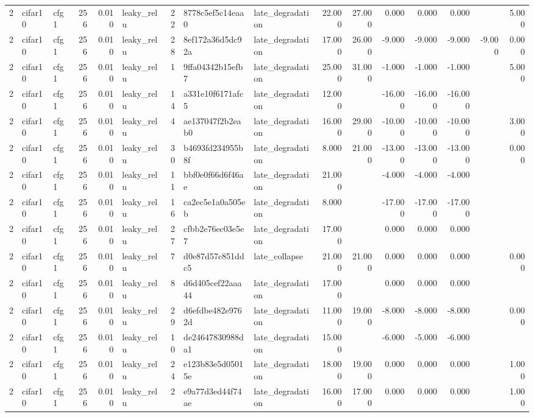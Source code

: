 \begin{table}[htbp]
{\begin{tabular}{@{}rllrrlrllrrrrrrr@{}}
2 & cifar10 & cfg1 & 256 & 0.010 & leaky\_relu & 22 & 8778c5ef5c14eaa0 & late\_degradation & 22.000 & 27.000 & 0.000 & 0.000 & 0.000 &  & 5.000 \\
2 & cifar10 & cfg1 & 256 & 0.010 & leaky\_relu & 28 & 8ef172a36d5dc92a & late\_degradation & 17.000 & 26.000 & -9.000 & -9.000 & -9.000 & -9.000 & 0.000 \\
2 & cifar10 & cfg1 & 256 & 0.010 & leaky\_relu & 1 & 9ffa04342b15efb7 & late\_degradation & 25.000 & 31.000 & -1.000 & -1.000 & -1.000 &  & 5.000 \\
2 & cifar10 & cfg1 & 256 & 0.010 & leaky\_relu & 14 & a331e10f6171afc5 & late\_degradation & 12.000 &  & -16.000 & -16.000 & -16.000 &  &  \\
2 & cifar10 & cfg1 & 256 & 0.010 & leaky\_relu & 4 & ae137047f2b2eab0 & late\_degradation & 16.000 & 29.000 & -10.000 & -10.000 & -10.000 &  & 3.000 \\
2 & cifar10 & cfg1 & 256 & 0.010 & leaky\_relu & 30 & b4693fd234955b8f & late\_degradation & 8.000 & 21.000 & -13.000 & -13.000 & -13.000 &  & 0.000 \\
2 & cifar10 & cfg1 & 256 & 0.010 & leaky\_relu & 11 & bbf0e0f66d6f46ae & late\_degradation & 21.000 &  & -4.000 & -4.000 & -4.000 &  &  \\
2 & cifar10 & cfg1 & 256 & 0.010 & leaky\_relu & 16 & ca2ec5e1a0a505eb & late\_degradation & 8.000 &  & -17.000 & -17.000 & -17.000 &  &  \\
2 & cifar10 & cfg1 & 256 & 0.010 & leaky\_relu & 27 & cfbb2e76ec03e5e7 & late\_degradation & 17.000 &  & 0.000 & 0.000 & 0.000 &  &  \\
2 & cifar10 & cfg1 & 256 & 0.010 & leaky\_relu & 7 & d0e87d57c851ddc5 & late\_collapse & 21.000 & 21.000 & 0.000 & 0.000 & 0.000 &  & 0.000 \\
2 & cifar10 & cfg1 & 256 & 0.010 & leaky\_relu & 8 & d6d405cef22aaa44 & late\_degradation & 17.000 &  & 0.000 & 0.000 & 0.000 &  &  \\
2 & cifar10 & cfg1 & 256 & 0.010 & leaky\_relu & 29 & d6efdbe482e9762d & late\_degradation & 11.000 & 19.000 & -8.000 & -8.000 & -8.000 &  & 0.000 \\
2 & cifar10 & cfg1 & 256 & 0.010 & leaky\_relu & 10 & de24647830988da1 & late\_degradation & 15.000 &  & -6.000 & -5.000 & -6.000 &  &  \\
2 & cifar10 & cfg1 & 256 & 0.010 & leaky\_relu & 24 & e123b83e5d05015e & late\_degradation & 18.000 & 19.000 & 0.000 & 0.000 & 0.000 &  & 1.000 \\
2 & cifar10 & cfg1 & 256 & 0.010 & leaky\_relu & 2 & e9a77d3ed44f74ae & late\_degradation & 16.000 & 17.000 & 0.000 & 0.000 & 0.000 &  & 1.000 \\

\end{tabular}}
\end{table}
